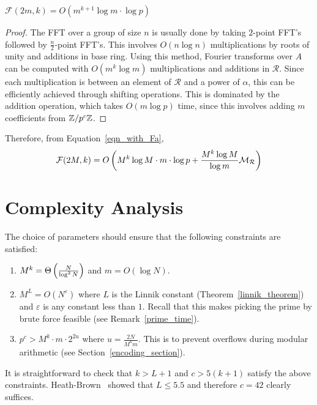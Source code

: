 \documentclass[11pt]{article}
\renewcommand{\R}{\mathcal{R}} %
\renewcommand{\F}{\mathcal{F}} %
\newcommand{\mr}{\mathcal{M}_\mathcal{R}} %
\begin{document}
\begin{lemma}\label{lem-Fmk}
$\F(2m,k) = O(m^{k+1}\log m\cdot \log p)$
\end{lemma}
\begin{proof}
The FFT over a group of size $n$ is usually done by taking $2$-point
FFT's followed by $\frac{n}{2}$-point FFT's. This involves $O(n\log
n)$ multiplications by roots of unity and additions in base
ring. Using this method, Fourier transforms over $A$ can be computed
with $O(m^k\log m)$ multiplications and additions in $\R$. Since each
multiplication is between an element of $\R$ and a power of $\alpha$,
this can be efficiently achieved through shifting operations. This is
dominated by the addition operation, which takes $O(m\log p)$ time,
since this involves adding $m$ coefficients {}from $\mathbb{Z}/p^c\mathbb{Z}$.
\end{proof}

Therefore, {}from Equation~\ref{eqn_with_Fa},
\begin{equation}\label{eqn_FFT_complexity}
\F(2M,k) = O\inparen{M^k\log M\cdot m\cdot \log p + \frac{M^k\log
    M}{\log m}\mr}
\end{equation}

\medskip

\section{Complexity Analysis}\label{complexity_section}

The choice of parameters should ensure that the following constraints
are satisfied:
\begin{enumerate}
\item $M^k = \Theta\left(\frac{N}{\log^2N}\right)$ and $m = O(\log
  N)$.
\item $M^L = O(N^\varepsilon)$ where $L$ is the Linnik constant
  (Theorem~\ref{linnik_theorem}) and $\varepsilon$ is any constant less
  than $1$. Recall that this makes picking the prime by brute force
  feasible (see Remark~\ref{prime_time}).
\item $p^c > M^k\cdot m\cdot 2^{2u}$ where $u = \frac{2N}{M^km}$. This
  is to prevent overflows during modular arithmetic (see
  Section~\ref{encoding_section}).
\end{enumerate}
\noindent
It is straightforward to check that $k > L+1$ and $c > 5(k+1)$ satisfy
the above constraints. Heath-Brown~\cite{Brown} showed that $L\leq
5.5$ and therefore $c = 42$ clearly suffices.\\
\end{document}
